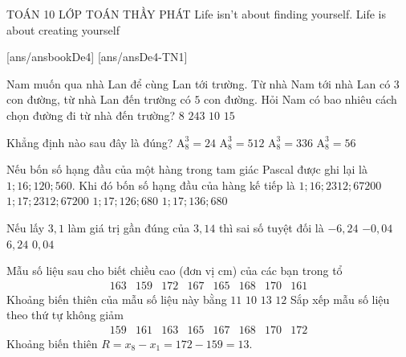 \begin{name}
	{\tenchude}
	{TOÁN 10}
	{LỚP TOÁN THẦY PHÁT}
	{Life isn’t about finding yourself. Life is about creating yourself}
\end{name}
[ans/ansbookDe4]
\TN
{}[ans/ansDe4-TN1]
\begin{ex} %
Nam muốn qua nhà Lan để cùng Lan tới trường. Từ nhà Nam tới nhà Lan có $3$ con đường, từ nhà Lan đến trường có $5$ con đường. Hỏi Nam có bao nhiêu cách chọn đường đi từ nhà đến trường?
\choice
{$8$}
{$243$}%
{$10$}
{\True $15$}
\end{ex}

\begin{ex}%
Khẳng định nào sau đây là đúng?
\choice
{$\mathrm{A}_8^3=24$}
{$\mathrm{A}_8^3=512$}
{\True $\mathrm{A}_8^3=336$}
{$\mathrm{A}_8^3=56$}
\end{ex}

\begin{ex}%
Nếu bốn số hạng đầu của một hàng trong tam giác Pascal được ghi lại là  $1; 16; 120; 560$. Khi đó bốn số hạng đầu của hàng kế tiếp là
\choice
{$1; 16; 2312; 67200$}
{$1; 17; 2312; 67200$}
{$1; 17; 126;  680$}
{\True $1; 17; 136; 680$}
\end{ex}

\begin{ex}%
	Nếu lấy $3{,}1$ làm giá trị gần đúng của $3{,}14$ thì sai số tuyệt đối là
	\choice
	{$-6{,}24$}
	{$-0{,}04$}
	{$6{,}24$}
	{\True $0{,}04$}
\end{ex}

\begin{ex}%
	Mẫu số liệu sau cho biết chiều cao (đơn vị cm) của các bạn trong tổ
	\[\begin{array}{llllllll}163 & 159 & 172 & 167 & 165 & 168 & 170 & 161\end{array}\]
	Khoảng biến thiên của mẫu số liệu này bằng
	\choice
	{$11$}
	{$10$}
	{\True $13$}
	{$12$}
	\loigiai
	{
		Sắp xếp mẫu số liệu theo thứ tự không giảm
		\[
			\begin{array}{llllllll}
				159 & 161 & 163 & 165 & 167 & 168 & 170 & 172
			\end{array}
		\]
		Khoảng biến thiên $R=x_8-x_1=172-159=13$.
	}
\end{ex}

